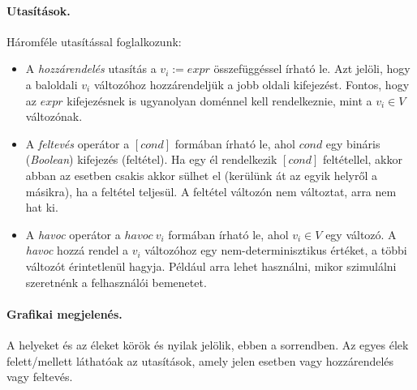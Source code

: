 \paragraph{Utasítások.}
Háromféle utasítással foglalkozunk: 

\begin{itemize}
	\item A \emph{hozzárendelés} utasítás a $v_i := \mathit{expr}$ összefüggéssel írható le. Azt jelöli, hogy a baloldali $v_i$ változóhoz hozzárendeljük a jobb oldali kifejezést. Fontos, hogy az $\mathit{expr}$ kifejezésnek is ugyanolyan doménnel kell rendelkeznie, mint a $v_i \in V$ változónak.
	
	\item A \emph{feltevés} operátor a $[\mathit{cond}]$ formában írható le, ahol $\mathit{cond}$ egy bináris (\emph{Boolean}) kifejezés (feltétel). Ha egy él rendelkezik $\mathit{[cond]}$ feltétellel, akkor abban az esetben csakis akkor sülhet el (kerülünk át az egyik helyről a másikra), ha a feltétel teljesül. A feltétel változón nem változtat, arra nem hat ki.
	
	\item A \emph{havoc} operátor a $\mathit{havoc}~v_i$ formában írható le, ahol $v_i \in V$ egy változó. A \emph{havoc} hozzá rendel a $v_i$ változóhoz egy nem-determinisztikus értéket, a többi változót érintetlenül hagyja. Például arra lehet használni, mikor szimulálni szeretnénk a felhasználói bemenetet.
\end{itemize}

\paragraph{Grafikai megjelenés.}
A helyeket és az éleket körök és nyilak jelölik, ebben a sorrendben. Az egyes élek felett/mellett láthatóak az utasítások, amely jelen esetben vagy hozzárendelés vagy feltevés. 

